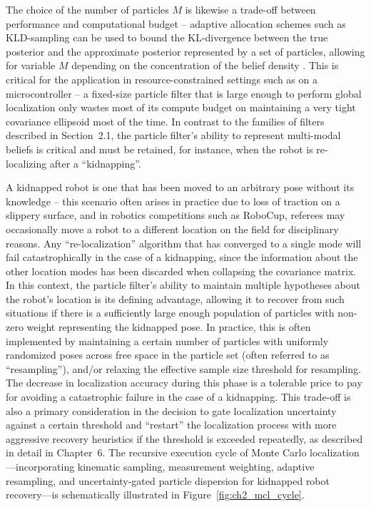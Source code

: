 The choice of the number of particles $M$ is likewise a trade-off between performance and computational budget -- adaptive allocation schemes such as KLD-sampling can be used to bound the KL-divergence between the true posterior and the approximate posterior represented by a set of particles, allowing for variable $M$ depending on the concentration of the belief density \cite{fox2003kld}. This is critical for the application in resource-constrained settings such as on a microcontroller -- a fixed-size particle filter that is large enough to perform global localization only wastes most of its compute budget on maintaining a very tight covariance ellipsoid most of the time. In contrast to the families of filters described in Section~2.1, the particle filter's ability to represent multi-modal beliefs is critical and must be retained, for instance, when the robot is re-localizing after a ``kidnapping''.

A kidnapped robot is one that has been moved to an arbitrary pose without its knowledge -- this scenario often arises in practice due to loss of traction on a slippery surface, and in robotics competitions such as RoboCup, referees may occasionally move a robot to a different location on the field for disciplinary reasons. Any ``re-localization'' algorithm that has converged to a single mode will fail catastrophically in the case of a kidnapping, since the information about the other location modes has been discarded when collapsing the covariance matrix. In this context, the particle filter's ability to maintain multiple hypotheses about the robot's location is its defining advantage, allowing it to recover from such situations if there is a sufficiently large enough population of particles with non-zero weight representing the kidnapped pose. In practice, this is often implemented by maintaining a certain number of particles with uniformly randomized poses across free space in the particle set (often referred to as ``resampling''), and/or relaxing the effective sample size threshold for resampling. The decrease in localization accuracy during this phase is a tolerable price to pay for avoiding a catastrophic failure in the case of a kidnapping. This trade-off is also a primary consideration in the decision to gate localization uncertainty against a certain threshold and ``restart'' the localization process with more aggressive recovery heuristics if the threshold is exceeded repeatedly, as described in detail in Chapter~6. The recursive execution cycle of Monte Carlo localization—incorporating kinematic sampling, measurement weighting, adaptive resampling, and uncertainty-gated particle dispersion for kidnapped robot recovery—is schematically illustrated in Figure~\ref{fig:ch2_mcl_cycle}.

